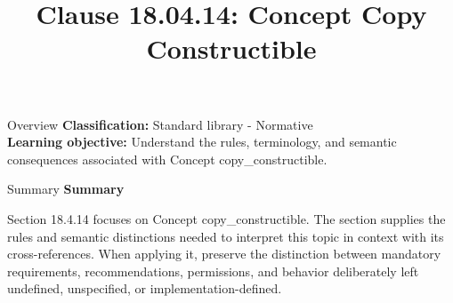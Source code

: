 \documentclass[10pt,letterpaper]{article}
\title{Clause 18.04.14: Concept Copy Constructible}
\author{}
\date{}
\begin{document}
\maketitle
\begin{CornellOverviewBox}{Overview}
\textbf{Classification:} Standard library - Normative\\[2pt]
\textbf{Learning objective:} Understand the rules, terminology, and semantic consequences associated with Concept copy\_constructible.
\end{CornellOverviewBox}\begin{CornellSummaryBox}{Summary}
{\sffamily\bfseries\color{Accent} Summary}\par\vspace{3pt}Section 18.4.14 focuses on Concept copy\_constructible. The section supplies the rules and semantic distinctions needed to interpret this topic in context with its cross-references. When applying it, preserve the distinction between mandatory requirements, recommendations, permissions, and behavior deliberately left undefined, unspecified, or implementation-defined.
\end{CornellSummaryBox}
\end{document}
